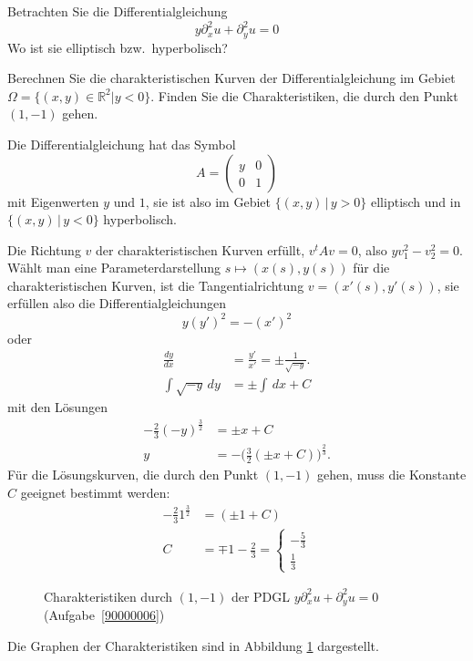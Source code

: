 Betrachten Sie die Differentialgleichung
\[
y\partial_x^2u+\partial_y^2u=0
\]
Wo ist sie elliptisch bzw.~hyperbolisch?

Berechnen Sie die charakteristischen Kurven der Differentialgleichung
im Gebiet $\Omega=\{(x,y)\in\mathbb R^2|y<0\}$.
Finden Sie die Charakteristiken, die durch den Punkt
$(1,-1)$ gehen.

\begin{loesung}
Die Differentialgleichung hat das Symbol
\[
A=\begin{pmatrix}y&0\\0&1\end{pmatrix}
\]
mit Eigenwerten $y$ und $1$, sie ist also im Gebiet $\{(x,y)\,|\,y>0\}$
elliptisch und in $\{(x,y)\,|\,y<0\}$ hyperbolisch.

Die Richtung $v$ der charakteristischen Kurven erfüllt,
$v^tAv=0$, also $yv_1^2-v_2^2=0$. Wählt man eine
Parameterdarstellung $s\mapsto(x(s),y(s))$ für die
charakteristischen Kurven, ist die Tangentialrichtung
$v=(x'(s),y'(s))$,
sie erfüllen also
die Differentialgleichungen
\[
y(y')^2=-(x')^2
\]
oder
\begin{align*}
\frac{dy}{dx}&=\frac{y'}{x'}=\pm\frac1{\sqrt{-y}}.
\\
\int\sqrt{-y}\,dy&=\pm\int \,dx+C
\end{align*}
mit den Lösungen
\begin{align*}
-\frac23(-y)^{\frac32}&=\pm x+C
\\
y&=-\biggl(\frac32(\pm x+C)\biggr)^{\frac23}.
\end{align*}
Für die Lösungskurven, die durch den Punkt $(1,-1)$ gehen,
muss die Konstante $C$ geeignet bestimmt werden:
\begin{align*}
-\frac231^{\frac32}&=(\pm1+C)\\
C&=\mp 1-\frac23
=\begin{cases}
-\frac53\\
\frac13
\end{cases}
\end{align*}
\begin{figure}
\begin{center}
\end{center}
\caption{Charakteristiken durch $(1,-1)$ der PDGL $y\partial_x^2u+\partial_y^2u=0$ (Aufgabe~\ref{90000006})
\label{90000006:char}}
\end{figure}
Die Graphen der Charakteristiken sind in Abbildung \ref{90000006:char}
dargestellt.
\end{loesung}
